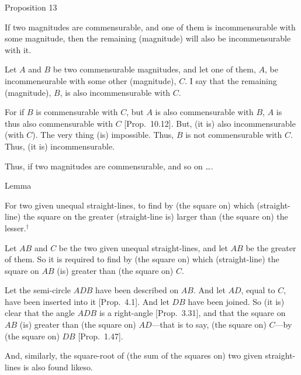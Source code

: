 
\begin{center}
{\large Proposition 13}
\end{center}

If two magnitudes are commensurable, and
one of them is incommensurable  with some magnitude, then the remaining (magnitude)
will also be incommensurable with it.

\epsfysize=0.8in
\centerline{}

Let $A$ and $B$ be two commensurable magnitudes, and let one
of them, $A$, be incommensurable with some other (magnitude),
$C$. I say that the remaining (magnitude), $B$, is also incommensurable
with $C$.

For if $B$ is commensurable with $C$, but $A$ is also commensurable
with $B$, $A$ is thus also commensurable with $C$ [Prop.~10.12]. But, (it is) also incommensurable (with
$C$). The very thing (is) impossible. Thus, $B$ is not commensurable
with $C$. Thus, (it is) incommensurable.

Thus, if two magnitudes are commensurable, and so on \ldots.


\begin{center}
{\large Lemma}
\end{center}

For two given unequal straight-lines, to find by (the square on) which (straight-line)
the square on the greater (straight-line is) larger   than (the square on) the lesser.$^\dag$

\epsfysize=1.2in
\centerline{}

Let $AB$ and $C$ be the two given unequal straight-lines, and let $AB$
be the greater of them. So it is required to find by (the square on) which (straight-line)  the square on $AB$ (is) greater  than (the square on) $C$.

Let the semi-circle $ADB$ have been described on $AB$.  And let $AD$,
equal to $C$, have been inserted into it [Prop.~4.1]. 
And let $DB$ have been joined. So (it is) clear that the angle $ADB$
is  a right-angle [Prop.~3.31], and that the square on $AB$
(is) greater than (the square on) $AD$---that is to say, (the square on) $C$---by (the square on) $DB$ [Prop.~1.47].

And, similarly, the square-root of (the sum of the squares on) two given straight-lines
is also found likeso.

